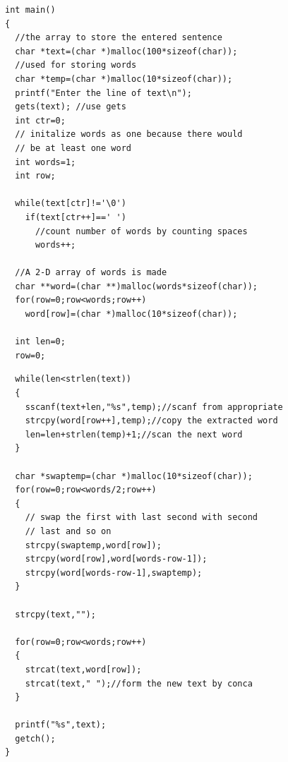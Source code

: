 \documentclass[unknownkeysallowed]{beamer}
\begin{document}
  \begin{frame}[fragile]
  
  \begin{multicols}{2}

  \begin{verbatim}
int main()
{
  //the array to store the entered sentence
  char *text=(char *)malloc(100*sizeof(char));
  //used for storing words
  char *temp=(char *)malloc(10*sizeof(char));
  printf("Enter the line of text\n");
  gets(text); //use gets
  int ctr=0;
  // initalize words as one because there would
  // be at least one word
  int words=1; 
  int row;   
  
  while(text[ctr]!='\0')
    if(text[ctr++]==' ')
      //count number of words by counting spaces
      words++;
  
  //A 2-D array of words is made
  char **word=(char **)malloc(words*sizeof(char));
  for(row=0;row<words;row++)
    word[row]=(char *)malloc(10*sizeof(char));
    
  int len=0;
  row=0;
  \end{verbatim}

\columnbreak  
  
  \begin{verbatim}
  while(len<strlen(text))
  {
    sscanf(text+len,"%s",temp);//scanf from appropriate
    strcpy(word[row++],temp);//copy the extracted word
    len=len+strlen(temp)+1;//scan the next word
  }
  
  char *swaptemp=(char *)malloc(10*sizeof(char));
  for(row=0;row<words/2;row++)
  {
    // swap the first with last second with second 
    // last and so on
    strcpy(swaptemp,word[row]);
    strcpy(word[row],word[words-row-1]);
    strcpy(word[words-row-1],swaptemp);
  }
  
  strcpy(text,"");
  
  for(row=0;row<words;row++)
  {
    strcat(text,word[row]);
    strcat(text," ");//form the new text by conca
  }
  
  printf("%s",text);
  getch();
}
\end{verbatim}  
  
\end{multicols}
\end{frame}

\end{document}

